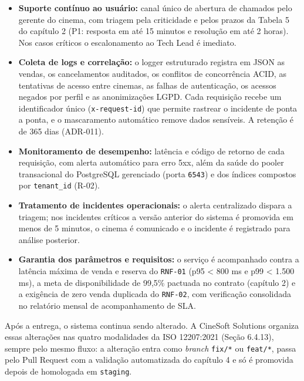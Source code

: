 \begin{itemize}
\item \textbf{Suporte contínuo ao usuário:} canal único de abertura de chamados pelo gerente do cinema, com triagem pela criticidade e pelos prazos da Tabela 5 do capítulo 2 (P1: resposta em até 15 minutos e resolução em até 2 horas). Nos casos críticos o escalonamento ao Tech Lead é imediato.
\item \textbf{Coleta de logs e correlação:} o logger estruturado registra em JSON as vendas, os cancelamentos auditados, os conflitos de concorrência ACID, as tentativas de acesso entre cinemas, as falhas de autenticação, os acessos negados por perfil e as anonimizações LGPD. Cada requisição recebe um identificador único (\texttt{x-\allowbreak\hspace{0pt plus 1pt}request-\allowbreak\hspace{0pt plus 1pt}id}) que permite rastrear o incidente de ponta a ponta, e o mascaramento automático remove dados sensíveis. A retenção é de 365 dias (ADR-011).
\item \textbf{Monitoramento de desempenho:} latência e código de retorno de cada requisição, com alerta automático para erro 5xx, além da saúde do pooler transacional do PostgreSQL gerenciado (porta \texttt{6543}) e dos índices compostos por \texttt{tenant\_id} (R-02).
\item \textbf{Tratamento de incidentes operacionais:} o alerta centralizado dispara a triagem; nos incidentes críticos a versão anterior do sistema é promovida em menos de 5 minutos, o cinema é comunicado e o incidente é registrado para análise posterior.
\item \textbf{Garantia dos parâmetros e requisitos:} o serviço é acompanhado contra a latência máxima de venda e reserva do \texttt{RNF-01} (p95 < 800 ms e p99 < 1.500 ms), a meta de disponibilidade de 99,5\% pactuada no contrato (capítulo 2) e a exigência de zero venda duplicada do \texttt{RNF-02}, com verificação consolidada no relatório mensal de acompanhamento de SLA.
\end{itemize}


Após a entrega, o sistema continua sendo alterado. A CineSoft Solutions organiza essas alterações nas quatro modalidades da ISO 12207:2021 (Seção 6.4.13), sempre pelo mesmo fluxo: a alteração entra como \emph{branch} \texttt{fix/*} ou \texttt{feat/*}, passa pelo Pull Request com a validação automatizada do capítulo 4 e só é promovida depois de homologada em \texttt{staging}.

